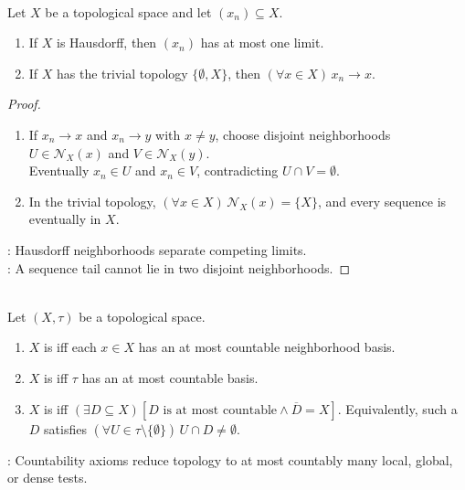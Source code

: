 \begin{proposition} \label{prop:hausdorff-sequence-limits-unique} \\
Let $X$ be a topological space and let $(x_n)\subseteq X$.
\begin{enumerate}[label=(\roman*)]
\setlength{\itemsep}{0pt}
\item If $X$ is Hausdorff, then $(x_n)$ has at most one limit.
\item If $X$ has the trivial topology $\{\emptyset,X\}$, then $(\forall x\in X)\,x_n\to x$.
\end{enumerate}
\begin{proof}
\begin{enumerate}[label=(\roman*)]
\setlength{\itemsep}{0pt}
\item[$(i)$] If $x_n\to x$ and $x_n\to y$ with $x\neq y$, choose disjoint neighborhoods $U\in\mathcal{N}_X(x)$ and $V\in\mathcal{N}_X(y)$.\\
Eventually $x_n\in U$ and $x_n\in V$, contradicting $U\cap V=\emptyset$.
\item[$(ii)$] In the trivial topology, $(\forall x\in X)\,\mathcal{N}_X(x)=\{X\}$, and every sequence is eventually in $X$.
\end{enumerate}
: Hausdorff neighborhoods separate competing limits.\\
: A sequence tail cannot lie in two disjoint neighborhoods.
\end{proof}
\end{proposition}

\begin{definition} \label{def:topological-countability-axioms} \\
Let $(X,\tau)$ be a topological space.
\begin{enumerate}[label=(\roman*)]
\setlength{\itemsep}{0pt}
\item $X$ is  iff each $x\in X$ has an at most countable neighborhood basis.
\item $X$ is  iff $\tau$ has an at most countable basis.
\item $X$ is  iff $(\exists D\subseteq X)[D\text{ is at most countable}\land\overline{D}=X]$. Equivalently, such a $D$ satisfies $(\forall U\in\tau\setminus\{\emptyset\})\,U\cap D\neq\emptyset$.
\end{enumerate}
: Countability axioms reduce topology to at most countably many local, global, or dense tests.
\end{definition}

